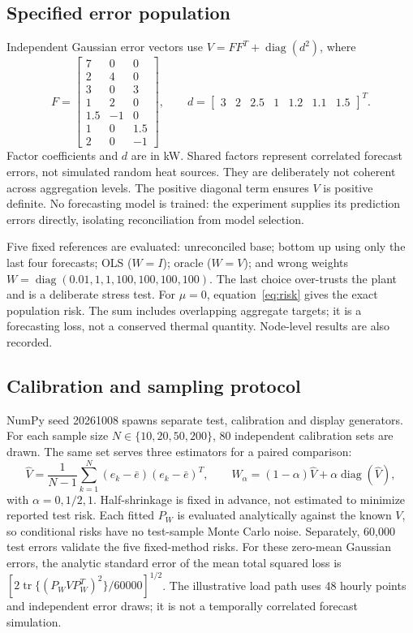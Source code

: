 \documentclass[10pt,a4paper]{article}
\begin{document}
\subsection{Specified error population}
Independent Gaussian error vectors use $V=FF^T+\operatorname{diag}(d^2)$, where
\begin{equation}
 F=\begin{bmatrix}
 7&0&0\\2&4&0\\3&0&3\\1&2&0\\1.5&-1&0\\1&0&1.5\\2&0&-1
 \end{bmatrix},\qquad
 d=\begin{bmatrix}3&2&2.5&1&1.2&1.1&1.5\end{bmatrix}^T.
 \label{eq:population}
\end{equation}
Factor coefficients and $d$ are in kW. Shared factors represent correlated
forecast errors, not simulated random heat sources. They are deliberately not
coherent across aggregation levels. The positive diagonal term ensures $V$ is
positive definite. No forecasting model is trained: the experiment supplies its
prediction errors directly, isolating reconciliation from model selection.

Five fixed references are evaluated: unreconciled base; bottom up using only
the last four forecasts; OLS ($W=I$); oracle ($W=V$); and wrong weights
$W=\operatorname{diag}(0.01,1,1,100,100,100,100)$.
The last choice over-trusts the plant and is a deliberate stress test.
For $\mu=0$, equation~\eqref{eq:risk} gives the exact population risk.
The sum includes overlapping aggregate targets; it is a forecasting loss,
not a conserved thermal quantity. Node-level results are also recorded.

\subsection{Calibration and sampling protocol}
NumPy seed 20261008 spawns separate test, calibration and display generators.
For each sample size $N\in\{10,20,50,200\}$, 80 independent calibration sets
are drawn. The same set serves three estimators for a paired comparison:
\begin{equation}
 \hat V=\frac{1}{N-1}\sum_{k=1}^{N}(e_k-\bar e)(e_k-\bar e)^T,\qquad
 W_\alpha=(1-\alpha)\hat V+\alpha\operatorname{diag}(\hat V),
 \label{eq:shrinkage}
\end{equation}
with $\alpha=0,1/2,1$. Half-shrinkage is fixed in advance, not estimated to
minimize reported test risk. Each fitted $P_W$ is evaluated analytically against
the known $V$, so conditional risks have no test-sample Monte Carlo noise.
Separately, 60,000 test errors validate the five fixed-method risks. For these
zero-mean Gaussian errors, the analytic standard error of the mean total
squared loss is $[2\operatorname{tr}\{(P_WVP_W^T)^2\}/60000]^{1/2}$.
The illustrative load path uses 48 hourly points and independent error draws;
it is not a temporally correlated forecast simulation.
\newpage
\end{document}
